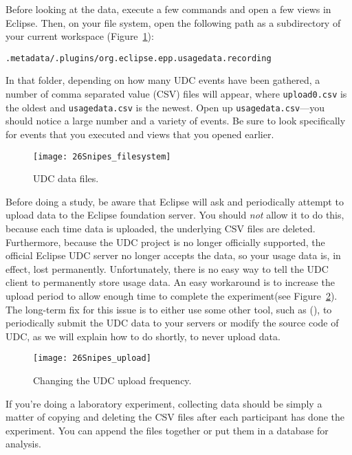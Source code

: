 Before looking at the data, execute a few commands and open a few views
in Eclipse.
Then, on your file system, open the following path as a subdirectory
of your current workspace (Figure~\ref{fig:filesystem}):

\begin{lstlisting}
.metadata/.plugins/org.eclipse.epp.usagedata.recording
\end{lstlisting}

\noindent
In that folder, depending on how many UDC events have been gathered,
a number of comma separated value (CSV) files will appear, where \texttt{upload0.csv} is the oldest
and \texttt{usagedata.csv} is the newest.
Open up \texttt{usagedata.csv}---you should notice a large number and a variety of events.
Be sure to look specifically for events that you executed and views that you opened earlier.

\begin{figure}
  \centering
  \texttt{[image: 26Snipes\_filesystem]}
  \caption{UDC data files.}\label{fig:filesystem}
\end{figure}

Before doing a study, be aware that Eclipse will ask and periodically attempt to upload
data to the Eclipse foundation server.
You should \emph{not} allow it to do this, because each time data is uploaded, the underlying
CSV files are deleted.
Furthermore, because the UDC project is no longer officially supported, the official Eclipse
UDC server no longer accepts the data, so your usage data is, in effect, lost permanently.
Unfortunately, there is no easy way to tell the UDC client to permanently store
usage data.
An easy workaround is to increase the upload period to allow enough time to complete the experiment(see Figure~\ref{fig:upload}).
The long-term fix for this issue is to either use some other tool, such as
\CodingSpectator{} (), to periodically submit the UDC
data to your servers or modify the source code of UDC, as we will explain how to
do shortly, to never upload data.

\begin{figure}
  \centering
  \texttt{[image: 26Snipes\_upload]}
  \caption{Changing the UDC upload frequency.}\label{fig:upload}
\end{figure}

If you're doing a laboratory experiment, collecting data should be simply a matter of
copying and deleting the CSV files after each participant has done the experiment.
You can append the files together or put them in a database for analysis.

